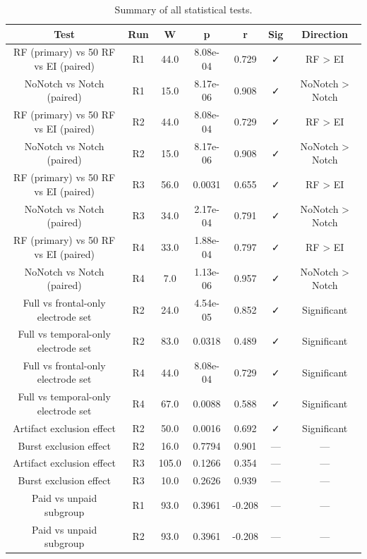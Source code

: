 \begin{table}[hptb]
\small
\centering
\begin{table}
\caption{Summary of all statistical tests.}
\label{tab:table3_stats}
\begin{tabular}{ccccccc}
\toprule
Test & Run & W & p & r & Sig & Direction \\
\midrule
RF (primary) vs 50%
RF vs EI (paired) & R1 & 44.0 & 8.08e-04 & 0.729 & ✓ & RF > EI \\
NoNotch vs Notch (paired) & R1 & 15.0 & 8.17e-06 & 0.908 & ✓ & NoNotch > Notch \\
RF (primary) vs 50%
RF vs EI (paired) & R2 & 44.0 & 8.08e-04 & 0.729 & ✓ & RF > EI \\
NoNotch vs Notch (paired) & R2 & 15.0 & 8.17e-06 & 0.908 & ✓ & NoNotch > Notch \\
RF (primary) vs 50%
RF vs EI (paired) & R3 & 56.0 & 0.0031 & 0.655 & ✓ & RF > EI \\
NoNotch vs Notch (paired) & R3 & 34.0 & 2.17e-04 & 0.791 & ✓ & NoNotch > Notch \\
RF (primary) vs 50%
RF vs EI (paired) & R4 & 33.0 & 1.88e-04 & 0.797 & ✓ & RF > EI \\
NoNotch vs Notch (paired) & R4 & 7.0 & 1.13e-06 & 0.957 & ✓ & NoNotch > Notch \\
Full vs frontal-only electrode set & R2 & 24.0 & 4.54e-05 & 0.852 & ✓ & Significant \\
Full vs temporal-only electrode set & R2 & 83.0 & 0.0318 & 0.489 & ✓ & Significant \\
Full vs frontal-only electrode set & R4 & 44.0 & 8.08e-04 & 0.729 & ✓ & Significant \\
Full vs temporal-only electrode set & R4 & 67.0 & 0.0088 & 0.588 & ✓ & Significant \\
Artifact exclusion effect & R2 & 50.0 & 0.0016 & 0.692 & ✓ & Significant \\
Burst exclusion effect & R2 & 16.0 & 0.7794 & 0.901 & — & — \\
Artifact exclusion effect & R3 & 105.0 & 0.1266 & 0.354 & — & — \\
Burst exclusion effect & R3 & 10.0 & 0.2626 & 0.939 & — & — \\
Paid vs unpaid subgroup & R1 & 93.0 & 0.3961 & -0.208 & — & — \\
Paid vs unpaid subgroup & R2 & 93.0 & 0.3961 & -0.208 & — & — \\
\bottomrule
\end{tabular}
\end{table}
\end{table}
